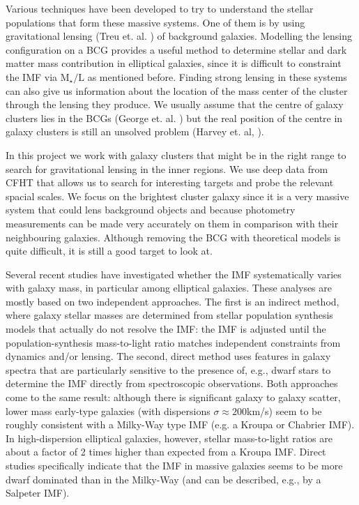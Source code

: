 Various techniques have been developed to try to understand the stellar populations that form these massive systems. One of them is by using gravitational lensing (Treu et. al. \citeyear{Reference1})  of  background galaxies. Modelling the lensing configuration on a BCG provides a useful method to determine stellar and dark matter mass contribution in elliptical galaxies, since it is difficult to constraint the IMF via $\textrm{M}_{\star}/\text{L}$ as mentioned before. Finding strong lensing in these systems can also give us information about the location of the mass center of the cluster through the lensing they produce. We usually assume that the centre of galaxy clusters lies in the BCGs (George et. al. \citeyear{Reference18}) but the real position of the centre in galaxy clusters is still an unsolved problem (Harvey et. al, \citeyear{Reference13}). 

In this project we work with galaxy clusters that might be in the right range to search for gravitational lensing in the inner regions. We use deep data from CFHT that allows us to search for interesting targets and probe the relevant spacial scales. We focus on the brightest cluster galaxy since it is a very massive system that could lens background objects and because photometry measurements can be made very accurately on them in comparison with their neighbouring galaxies. Although removing the BCG with theoretical models is quite difficult, it is still a good target to look at. 

Several recent studies have investigated whether the IMF systematically varies with galaxy mass, in particular among elliptical galaxies. These analyses are mostly based on two independent approaches. The first is an indirect method, where galaxy stellar masses are determined from stellar population synthesis models that actually do not resolve the IMF: the IMF is adjusted until the population-synthesis mass-to-light ratio matches independent constraints from dynamics and/or lensing. The second, direct method uses features in galaxy spectra that are particularly sensitive to the presence of, e.g., dwarf stars to determine the IMF directly from spectroscopic observations. Both approaches come to the same result: although there is significant galaxy to galaxy scatter, lower mass early-type galaxies (with dispersions $\sigma \approx 200$km/s) seem to be roughly consistent with a Milky-Way type IMF (e.g. a Kroupa or Chabrier IMF). In high-dispersion elliptical galaxies, however, stellar mass-to-light ratios are about a factor of 2 times higher than expected from a Kroupa IMF. Direct studies specifically indicate that the IMF in massive galaxies seems to be more dwarf dominated than in the Milky-Way (and can be described, e.g., by a Salpeter IMF).

